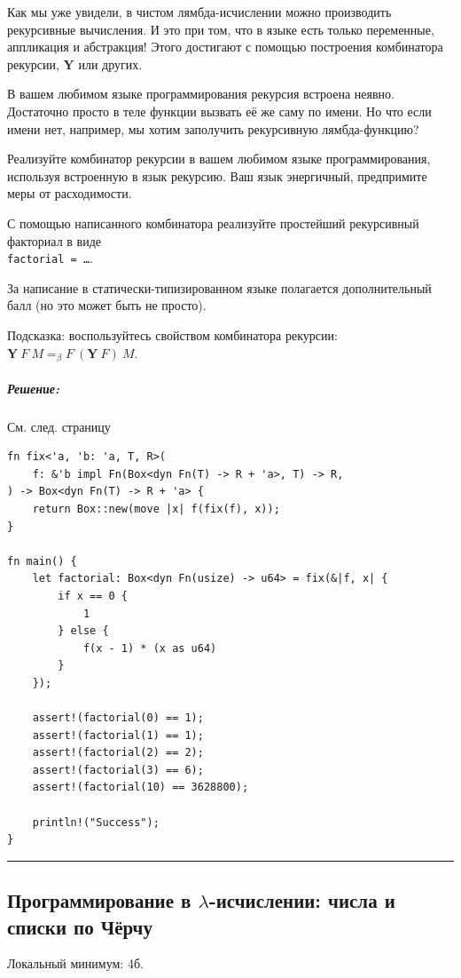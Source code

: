 \documentclass{article}
\newenvironment{proof}{\subparagraph{\hspace{-1em}Решение:\newline}\-}{\par\noindent\rule{\textwidth}{0.4pt}}
\newcommand{\comb}[1]{\mathbf{#1}}
\newcommand{\eqbeta}{=_\beta}
\begin{document}
    Как мы уже увидели, в чистом лямбда-исчислении можно производить рекурсивные вычисления.
    И это при том, что в языке есть только переменные, аппликация и абстракция!
    Этого достигают с помощью построения комбинатора рекурсии, $\comb{Y}$ или других.

    В вашем любимом языке программирования рекурсия встроена неявно.
    Достаточно просто в теле функции вызвать её же саму по имени.
    Но что если имени нет, например, мы хотим заполучить рекурсивную лямбда-функцию?

    Реализуйте комбинатор рекурсии в вашем любимом языке программирования, используя встроенную в язык рекурсию.
    Ваш язык энергичный, предпримите меры от расходимости.

    С помощью написанного комбинатора реализуйте простейший рекурсивный факториал в виде \\ \texttt{factorial = \ldots}.

    За написание в статически-типизированном языке полагается дополнительный балл (но это может быть не просто).

    Подсказка: воспользуйтесь свойством комбинатора рекурсии: $\comb{Y}~F~M \eqbeta F~(\comb{Y}~F)~M$.

    \begin{proof}
    См. след. страницу
    \pagebreak
\begin{verbatim}
fn fix<'a, 'b: 'a, T, R>(
    f: &'b impl Fn(Box<dyn Fn(T) -> R + 'a>, T) -> R,
) -> Box<dyn Fn(T) -> R + 'a> {
    return Box::new(move |x| f(fix(f), x));
}

fn main() {
    let factorial: Box<dyn Fn(usize) -> u64> = fix(&|f, x| {
        if x == 0 {
            1
        } else {
            f(x - 1) * (x as u64)
        }
    });

    assert!(factorial(0) == 1);
    assert!(factorial(1) == 1);
    assert!(factorial(2) == 2);
    assert!(factorial(3) == 6);
    assert!(factorial(10) == 3628800);

    println!("Success");
}
\end{verbatim}
    \end{proof}

    \subsection{Программирование в $\lambda$-исчислении: числа и списки по Чёрчу}

    Локальный минимум: 4б.
\end{document}
